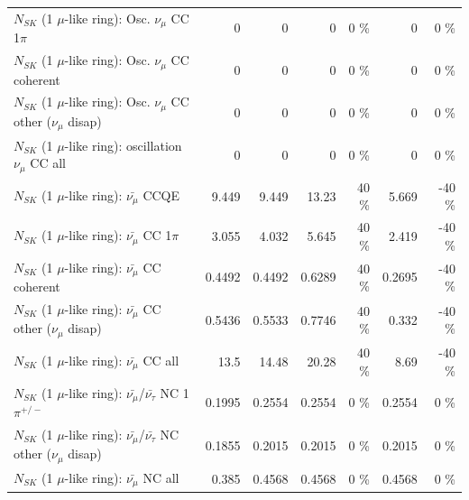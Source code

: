 \begin{table}
\begin{tabular}{| l | r | r | r  r | r  r |}
                          $N_{SK}$ (1 $\mu$-like ring): Osc. $\nu_\mu$ CC 1$\pi$ &               0 &               0 &               0 &        0 \%  &               0 &        0 \%  \\ 
                        $N_{SK}$ (1 $\mu$-like ring): Osc. $\nu_\mu$ CC coherent &               0 &               0 &               0 &        0 \%  &               0 &        0 \%  \\ 
         $N_{SK}$ (1 $\mu$-like ring): Osc. $\nu_\mu$ CC other ($\nu_\mu$ disap) &               0 &               0 &               0 &        0 \%  &               0 &        0 \%  \\ 
                      $N_{SK}$ (1 $\mu$-like ring): oscillation $\nu_\mu$ CC all &               0 &               0 &               0 &        0 \%  &               0 &        0 \%  \\ 
\hline
\hline
                              $N_{SK}$ (1 $\mu$-like ring): $\bar{\nu_\mu}$ CCQE &           9.449 &           9.449 &           13.23 &       40 \%  &           5.669 &      -40 \%  \\ 
                         $N_{SK}$ (1 $\mu$-like ring): $\bar{\nu_\mu}$ CC 1$\pi$ &           3.055 &           4.032 &           5.645 &       40 \%  &           2.419 &      -40 \%  \\ 
                       $N_{SK}$ (1 $\mu$-like ring): $\bar{\nu_\mu}$ CC coherent &          0.4492 &          0.4492 &          0.6289 &       40 \%  &          0.2695 &      -40 \%  \\ 
        $N_{SK}$ (1 $\mu$-like ring): $\bar{\nu_\mu}$ CC other ($\nu_\mu$ disap) &          0.5436 &          0.5533 &          0.7746 &       40 \%  &           0.332 &      -40 \%  \\ 
                          $N_{SK}$ (1 $\mu$-like ring): $\bar{\nu_{\mu}}$ CC all &            13.5 &           14.48 &           20.28 &       40 \%  &            8.69 &      -40 \%  \\ 
\hline
  $N_{SK}$ (1 $\mu$-like ring): $\bar{\nu_\mu}$/$\bar{\nu_\tau}$ NC 1$\pi^{+/-}$ &          0.1995 &          0.2554 &          0.2554 &        0 \%  &          0.2554 &        0 \%  \\ 
$N_{SK}$ (1 $\mu$-like ring): $\bar{\nu_\mu}$/$\bar{\nu_\tau}$ NC other ($\nu_\mu$ disap) &          0.1855 &          0.2015 &          0.2015 &        0 \%  &          0.2015 &        0 \%  \\ 
                          $N_{SK}$ (1 $\mu$-like ring): $\bar{\nu_{\mu}}$ NC all &           0.385 &          0.4568 &          0.4568 &        0 \%  &          0.4568 &        0 \%  \\ 

\end{tabular}
\end{table}
